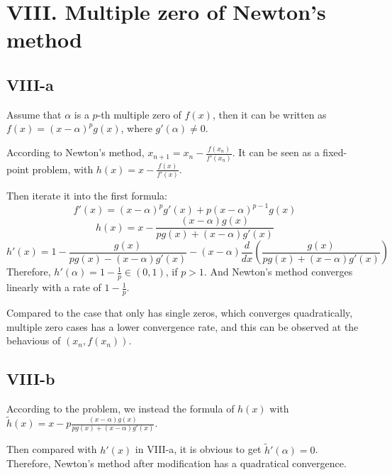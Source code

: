 \documentclass[a4paper]{article}
\begin{document}
\section*{VIII. Multiple zero of Newton's method}

\subsection*{VIII-a}
Assume that $\alpha$ is a $p$-th multiple zero of $f(x)$, then it can be written as $f(x) = (x-\alpha)^p g(x)$, where $g'(\alpha) \neq 0$.\cite{atkinson1991introduction}

According to Newton's method, $x_{n+1} = x_n - \frac{f(x_n)}{f'(x_n)}$. It can be seen as a fixed-point problem, with $h(x) = x - \frac{f(x)}{f'(x)}$.

Then iterate it into the first formula:
$$
f'(x) = (x-\alpha)^p g'(x) + p(x-\alpha)^{p-1}g(x)
$$
$$
h(x) = x - \frac{(x-\alpha)g(x)}{pg(x)+(x-\alpha)g'(x)}
$$
$$
h'(x) = 1 - \frac{g(x)}{pg(x)-(x-\alpha)g'(x)} - (x - \alpha)\frac{d}{dx}(\frac{g(x)}{pg(x)+(x-\alpha)g'(x)})
$$
Therefore, $h'(\alpha) = 1 - \frac{1}{p} \in (0,1)$, if $p > 1$. And Newton's method converges linearly with a rate of $1 - \frac{1}{p}$.

Compared to the case that only has single zeros, which converges quadratically, multiple zero cases has a lower convergence rate, and this can be observed at the behavious of $(x_n,f(x_n))$.

\subsection*{VIII-b}
According to the problem, we instead the formula of $h(x)$ with $\tilde{h}(x) = x - p\frac{(x-\alpha)g(x)}{pg(x)+(x-\alpha)g'(x)}$.

Then compared with $h'(x)$ in VIII-a, it is obvious to get $\tilde{h}'(\alpha) = 0$. Therefore, Newton's method after modification has a quadratical convergence.


\printbibliography
\end{document}
